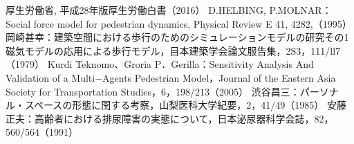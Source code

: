 \begin{thebibliography}{99}
  厚生労働省, 平成28年版厚生労働白書（2016）
  D.HELBING, P.MOLNAR：Social force model for pedestrian dynamics, Physical Review E 41, 4282,（1995）
  岡崎甚幸：建築空間における歩行のためのシミュレーションモデルの研究その1 磁気モデルの応用による歩行モデル，目本建築学会論文服告集，2S3，111/ll7（1979）
  Kurdi Teknomo、Groria P．Gerilla：Sensitivity Analysis And Validation of a Multi−Agents Pedestrian Model，Journal of the Eastern Asia Society for Transportation Studies，6，198/213（2005）
  渋谷昌三：パーソナル・スペースの形態に閏する考察，山梨医科大学紀要，2，41/49（1985）
  安藤正夫：高齢者における排尿障害の実態について，日本泌尿器科学会誌，82，560/564（1991）
\end{thebibliography}
